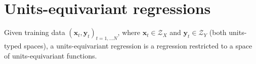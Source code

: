 \documentclass[twoside,11pt]{article}
\begin{document}




\section{Units-equivariant regressions} \label{sec:approach}

Given training data $(\mathbf x_t, \mathbf y_t)_{t=1,\ldots N}$, where $\mathbf x_t\in \mathcal Z_X$ and $\mathbf y_t\in \mathcal Z_Y$ (both units-typed spaces), a units-equivariant regression is a regression restricted to a space of units-equivariant functions.
\end{document}
